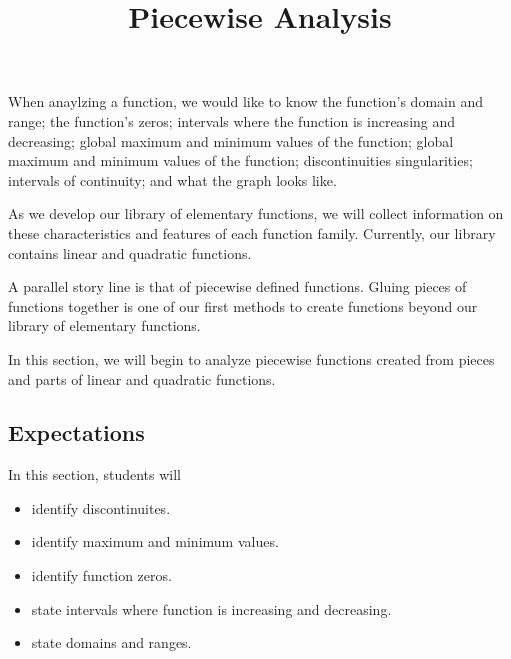 \documentclass{ximera}
\title{Piecewise Analysis}
\begin{document}
\begin{abstract}
\end{abstract}
\maketitle




When anaylzing a function, we would like to know the function's domain and range; the function's zeros; intervals where the function is increasing and decreasing; global maximum and minimum values of the function; global maximum and minimum values of the function; discontinuities singularities; intervals of continuity; and what the graph looks like.



As we develop our library of elementary functions, we will collect information on these characteristics and features of each function family.  Currently, our library contains linear and quadratic functions.  

A parallel story line is that of piecewise defined functions.  Gluing pieces of functions together is one of our first methods to create functions beyond our library of elementary functions.

In this section, we will begin to analyze piecewise functions created from pieces and parts of linear and quadratic functions.
















\subsection{Expectations}


\begin{sectionOutcomes}
In this section, students will 

\begin{itemize}
\item identify discontinuites.
\item identify maximum and minimum values.
\item identify function zeros.
\item state intervals where function is increasing and decreasing.
\item state domains and ranges.
\end{itemize}
\end{sectionOutcomes}
\end{document}
